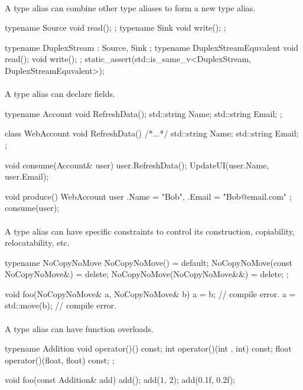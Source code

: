 \documentclass{article}
\begin{document}
\paragraph{}
A type alias can combine other type aliases to form a new type alias.
\begin{codeblock}
typename Source{ void read(); };
typename Sink{ void write(); };

typename DuplexStream : Source, Sink {};
typename DuplexStreamEquvalent {
  void read();
  void write();
};
static_assert(std::is_same_v<DuplexStream, DuplexStreamEquvalent>);
\end{codeblock}

\paragraph{}
A type alias can declare fields.
\begin{codeblock}
typename Account {
  void RefreshData();
  std::string Name;
  std::string Email;
};

class WebAccount {
  void RefreshData() { /*...*/ }
  std::string Name;
  std::string Email;
};

void consume(Account& user) {
  user.RefreshData();
  UpdateUI(user.Name, user.Email);
}

void produce() {
  WebAccount user{ .Name = "Bob", .Email = "Bob@email.com" };
  consume(user);
}
\end{codeblock}

\paragraph{}
A type alias can have specific constraints to control its construction, copiability, relocatability, etc.
\begin{codeblock}
typename NoCopyNoMove {
  NoCopyNoMove() = default;
  NoCopyNoMove(const NoCopyNoMove&) = delete;
  NoCopyNoMove(NoCopyNoMove&&) = delete;
};

void foo(NoCopyNoMove& a, NoCopyNoMove& b) {
  a = b; // compile error.
  a = std::move(b); // compile error.
}
\end{codeblock}

\paragraph{}
A type alias can have function overloads.

\begin{codeblock}
typename Addition {
  void operator()() const;
  int operator()(int , int) const;
  float operator()(float, float) const;
};

void foo(const Addition& add) {
  add();
  add(1, 2);
  add(0.1f, 0.2f);
}
\end{codeblock}
\end{document}
